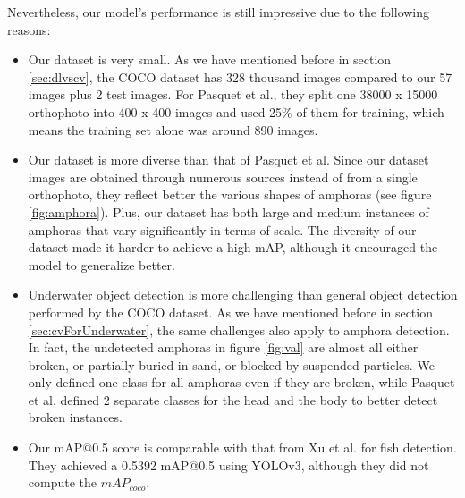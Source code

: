 \documentclass[a4paper, 11pt, oneside]{article}
\begin{document}
Nevertheless, our model's performance is still impressive due to the following reasons:

\begin{itemize}
  \item Our dataset is very small. As we have mentioned before in section \ref{sec:dlvscv}, the COCO dataset has 328
  thousand images compared to our 57 images plus 2 test images. For Pasquet et al., they split one 38000 x 15000
  orthophoto into 400 x 400 images and used 25\% of them for training, which means the training set alone was around
  890 images.
  \item Our dataset is more diverse than that of Pasquet et al. Since our dataset images are obtained through
  numerous sources instead of from a single orthophoto, they reflect better the various shapes of amphoras (see
  figure \ref{fig:amphora}). Plus, our dataset has both large and medium instances of amphoras that vary significantly
  in terms of scale. The diversity of our dataset made it harder to achieve a high mAP, although it encouraged
  the model to generalize better.
  \item Underwater object detection is more challenging than general object detection performed by the COCO dataset.
  As we have mentioned before in section \ref{sec:cvForUnderwater}, the same challenges also apply to amphora
  detection. In fact, the undetected amphoras in figure \ref{fig:val} are almost all either broken, or partially buried
  in sand, or blocked by suspended particles. We only defined one class for all amphoras even if they are broken, while
  Pasquet et al. defined 2 separate classes for the head and the body to better detect broken instances.
  \item Our mAP@0.5 score is comparable with that from Xu et al. \cite{xu2018underwater} for fish detection. They
  achieved a 0.5392 mAP@0.5 using YOLOv3, although they did not compute the $mAP_{coco}$.
\end{itemize}
\end{document}
